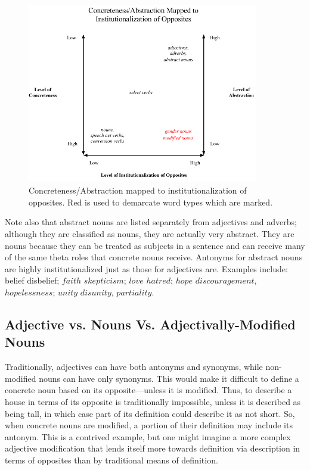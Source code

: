\begin{figure}[here]
	\centering
	\includegraphics[width=0.9\textwidth]{images/Diagram.png}
	\caption{Concreteness/Abstraction mapped to institutionalization of opposites.  Red is used to demarcate word types which are marked.}
	\label{fig:introFig}
\end{figure}
	
Note also that abstract nouns are listed separately from adjectives and adverbs; although they are classified as nouns, they are actually very abstract.  They are nouns because they can be treated as subjects in a sentence and can receive many of the same theta roles that concrete nouns receive.  
Antonyms for abstract nouns are highly institutionalized just as those for adjectives are.  Examples include: belief \opp disbelief; $faith$ \opp $skepticism$; $love$ \opp $hatred$; $hope$ \opp $discouragement$, $hopelessness$; $unity$ \opp $disunity$, $partiality$.

\subsection {Adjective vs. Nouns Vs. Adjectivally-Modified Nouns}  Traditionally, adjectives can have both antonyms and synonyms, while non-modified nouns can have only synonyms.  This would make it difficult to define a concrete noun based on its opposite—unless it is modified.  Thus, to describe a house in terms of its opposite is traditionally impossible, unless it is described as being tall, in which case part of its definition could describe it as not short.  So, when concrete nouns are modified, a portion of their definition may include its antonym.  This is a contrived example, but one might imagine a more complex adjective modification that lends itself more towards definition via description in terms of opposites than by traditional means of definition.  


